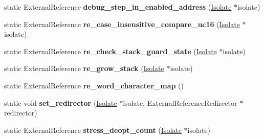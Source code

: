 \begin{DoxyCompactItemize}
\item 
static External\+Reference {\bfseries debug\+\_\+step\+\_\+in\+\_\+enabled\+\_\+address} (\hyperlink{classv8_1_1internal_1_1_isolate}{Isolate} $\ast$isolate)\hypertarget{classv8_1_1internal_1_1_b_a_s_e___e_m_b_e_d_d_e_d_a7e94cad9cb6388821310197e6c3c0d98}{}\label{classv8_1_1internal_1_1_b_a_s_e___e_m_b_e_d_d_e_d_a7e94cad9cb6388821310197e6c3c0d98}

\item 
static External\+Reference {\bfseries re\+\_\+case\+\_\+insensitive\+\_\+compare\+\_\+uc16} (\hyperlink{classv8_1_1internal_1_1_isolate}{Isolate} $\ast$isolate)\hypertarget{classv8_1_1internal_1_1_b_a_s_e___e_m_b_e_d_d_e_d_a12de3ed4097d6480a138b7ad8b412261}{}\label{classv8_1_1internal_1_1_b_a_s_e___e_m_b_e_d_d_e_d_a12de3ed4097d6480a138b7ad8b412261}

\item 
static External\+Reference {\bfseries re\+\_\+check\+\_\+stack\+\_\+guard\+\_\+state} (\hyperlink{classv8_1_1internal_1_1_isolate}{Isolate} $\ast$isolate)\hypertarget{classv8_1_1internal_1_1_b_a_s_e___e_m_b_e_d_d_e_d_abe50baa3bed598eb5fae861948ab0dcf}{}\label{classv8_1_1internal_1_1_b_a_s_e___e_m_b_e_d_d_e_d_abe50baa3bed598eb5fae861948ab0dcf}

\item 
static External\+Reference {\bfseries re\+\_\+grow\+\_\+stack} (\hyperlink{classv8_1_1internal_1_1_isolate}{Isolate} $\ast$isolate)\hypertarget{classv8_1_1internal_1_1_b_a_s_e___e_m_b_e_d_d_e_d_a1becf82d2036921d2d01bdee034c56e9}{}\label{classv8_1_1internal_1_1_b_a_s_e___e_m_b_e_d_d_e_d_a1becf82d2036921d2d01bdee034c56e9}

\item 
static External\+Reference {\bfseries re\+\_\+word\+\_\+character\+\_\+map} ()\hypertarget{classv8_1_1internal_1_1_b_a_s_e___e_m_b_e_d_d_e_d_a6a768f13ff4a1b3c229a11f2a5c7a35b}{}\label{classv8_1_1internal_1_1_b_a_s_e___e_m_b_e_d_d_e_d_a6a768f13ff4a1b3c229a11f2a5c7a35b}

\item 
static void {\bfseries set\+\_\+redirector} (\hyperlink{classv8_1_1internal_1_1_isolate}{Isolate} $\ast$isolate, External\+Reference\+Redirector $\ast$redirector)\hypertarget{classv8_1_1internal_1_1_b_a_s_e___e_m_b_e_d_d_e_d_a27b161fa629f0c605ae3dc3cf404d262}{}\label{classv8_1_1internal_1_1_b_a_s_e___e_m_b_e_d_d_e_d_a27b161fa629f0c605ae3dc3cf404d262}

\item 
static External\+Reference {\bfseries stress\+\_\+deopt\+\_\+count} (\hyperlink{classv8_1_1internal_1_1_isolate}{Isolate} $\ast$isolate)\hypertarget{classv8_1_1internal_1_1_b_a_s_e___e_m_b_e_d_d_e_d_a7f2307b057224489a31b9019ab4291bd}{}\label{classv8_1_1internal_1_1_b_a_s_e___e_m_b_e_d_d_e_d_a7f2307b057224489a31b9019ab4291bd}


\end{DoxyCompactItemize}
